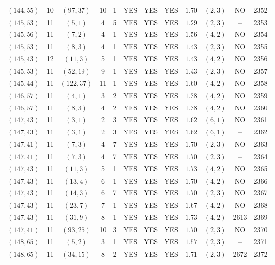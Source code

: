 \begin{longtable}{|c|c|c|c|c|c|c|c|c|c|c|c|}
$(144,55)$ & 10 & $(97,37)$ & 10 & 1 & YES & YES & YES & $1.70$ & $(2,3)$ & NO & 2352\\
$(145,53)$ & 11 & $(5,1)$ & 4 & 5 & YES & YES & YES & $1.29$ & $(2,3)$ & -- & 2353\\
$(145,56)$ & 11 & $(7,2)$ & 4 & 1 & YES & YES & YES & $1.56$ & $(4,2)$ & NO & 2354\\
$(145,53)$ & 11 & $(8,3)$ & 4 & 1 & YES & YES & YES & $1.43$ & $(2,3)$ & NO & 2355\\
$(145,43)$ & 12 & $(11,3)$ & 5 & 1 & YES & YES & YES & $1.43$ & $(4,2)$ & NO & 2356\\
$(145,53)$ & 11 & $(52,19)$ & 9 & 1 & YES & YES & YES & $1.43$ & $(2,3)$ & NO & 2357\\
$(145,44)$ & 11 & $(122,37)$ & 11 & 1 & YES & YES & YES & $1.60$ & $(4,2)$ & NO & 2358\\
$(146,57)$ & 11 & $(4,1)$ & 3 & 2 & YES & YES & YES & $1.38$ & $(4,2)$ & NO & 2359\\
$(146,57)$ & 11 & $(8,3)$ & 4 & 2 & YES & YES & YES & $1.38$ & $(4,2)$ & NO & 2360\\
$(147,43)$ & 11 & $(3,1)$ & 2 & 3 & YES & YES & YES & $1.62$ & $(6,1)$ & NO & 2361\\
$(147,43)$ & 11 & $(3,1)$ & 2 & 3 & YES & YES & YES & $1.62$ & $(6,1)$ & -- & 2362\\
$(147,41)$ & 11 & $(7,3)$ & 4 & 7 & YES & YES & YES & $1.70$ & $(2,3)$ & NO & 2363\\
$(147,41)$ & 11 & $(7,3)$ & 4 & 7 & YES & YES & YES & $1.70$ & $(2,3)$ & -- & 2364\\
$(147,43)$ & 11 & $(11,3)$ & 5 & 1 & YES & YES & YES & $1.73$ & $(4,2)$ & NO & 2365\\
$(147,43)$ & 11 & $(13,4)$ & 6 & 1 & YES & YES & YES & $1.70$ & $(4,2)$ & NO & 2366\\
$(147,43)$ & 11 & $(14,3)$ & 6 & 7 & YES & YES & YES & $1.70$ & $(2,3)$ & NO & 2367\\
$(147,43)$ & 11 & $(23,7)$ & 7 & 1 & YES & YES & YES & $1.67$ & $(4,2)$ & NO & 2368\\
$(147,43)$ & 11 & $(31,9)$ & 8 & 1 & YES & YES & YES & $1.73$ & $(4,2)$ & 2613 & 2369\\
$(147,41)$ & 11 & $(93,26)$ & 10 & 3 & YES & YES & YES & $1.70$ & $(2,3)$ & NO & 2370\\
$(148,65)$ & 11 & $(5,2)$ & 3 & 1 & YES & YES & YES & $1.57$ & $(2,3)$ & -- & 2371\\
$(148,65)$ & 11 & $(34,15)$ & 8 & 2 & YES & YES & YES & $1.71$ & $(2,3)$ & 2672 & 2372\\

\end{longtable}
